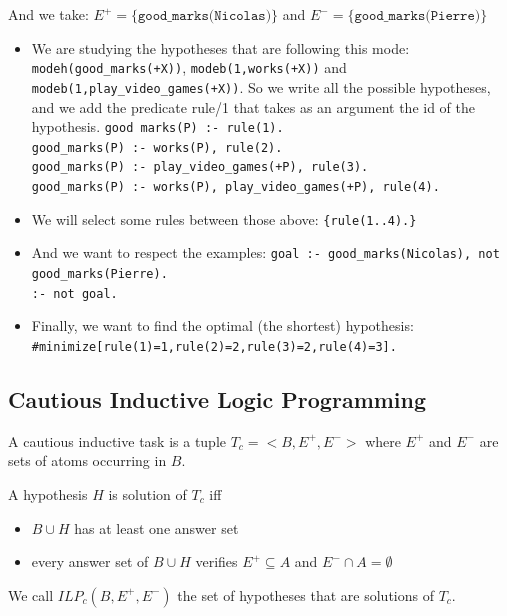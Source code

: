 And we take: $E^+=\{\texttt{good\_marks(Nicolas)}\}$ and $E^-=\{\texttt{good\_marks(Pierre)}\}$

\begin{itemize}
\item We are studying the hypotheses that are following this mode: \texttt{modeh(good\_marks(+X))}, \texttt{modeb(1,works(+X))} and \texttt{modeb(1,play\_video\_games(+X))}. So we write all the possible hypotheses, and we add the predicate rule/1 that takes as an argument the id of the hypothesis.\newline
\texttt{good marks(P) :- rule(1).\\
good\_marks(P) :- works(P), rule(2).\\
good\_marks(P) :- play\_video\_games(+P), rule(3).\\
good\_marks(P) :- works(P), play\_video\_games(+P), rule(4).}

\item We will select some rules between those above:\newline
\texttt{\{rule(1..4).\}}

\item And we want to respect the examples:\newline
\texttt{goal :- good\_marks(Nicolas), not good\_marks(Pierre).\\
:- not goal.}

\item Finally, we want to find the optimal (the shortest) hypothesis:\newline
\texttt{\#minimize[rule(1)=1,rule(2)=2,rule(3)=2,rule(4)=3].}

\end{itemize}





\subsection{Cautious Inductive Logic Programming}

\begin{definition}

A cautious inductive task is a tuple $T_c=<B, E^+, E^->$ where $E^+$ and $E^-$ are sets of atoms occurring in $B$.

\smallskip

A hypothesis $H$ is solution of $T_c$ iff 
\begin{itemize}
\item $B\cup H$ has at least one answer set
\item every answer set of $B\cup H$ verifies $E^+\subseteq A$ and $E^-\cap A = \emptyset$
\end{itemize}

\smallskip

We call $ILP_c(B,E^+,E^-)$ the set of hypotheses that are solutions of $T_c$. 

\end{definition}

